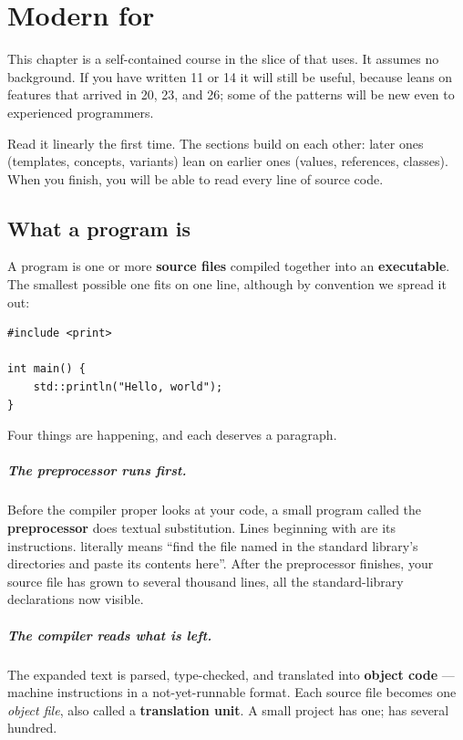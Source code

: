 \chapter{Modern \cpp{} for \maya{}}
\label{ch:cpp}

This chapter is a self-contained course in the slice of \cpp{} that
\maya{} uses. It assumes no \cpp{} background. If you have written
\cpp{}11 or \cpp{}14 it will still be useful, because \maya{} leans
on features that arrived in \cpp{}20, \cpp{}23, and \cpp{}26; some of
the patterns will be new even to experienced \cpp{} programmers.

Read it linearly the first time. The sections build on each other:
later ones (templates, concepts, variants) lean on earlier ones
(values, references, classes). When you finish, you will be able to
read every line of \maya{} source code.

\section{What a \cpp{} program is}
\label{sec:cpp:program}

A \cpp{} program is one or more \textbf{source files} compiled
together into an \textbf{executable}. The smallest possible one fits
on one line, although by convention we spread it out:

\begin{lstlisting}
#include <print>

int main() {
    std::println("Hello, world");
}
\end{lstlisting}

Four things are happening, and each deserves a paragraph.

\paragraph{The preprocessor runs first.}
Before the compiler proper looks at your code, a small program called
the \textbf{preprocessor} does textual substitution. Lines beginning
with \code{\#} are its instructions. 
literally means ``find the file named  in the standard
library's directories and paste its contents here''. After the
preprocessor finishes, your source file has grown to several
thousand lines, all the standard-library declarations now visible.

\paragraph{The compiler reads what is left.}
The expanded text is parsed, type-checked, and translated into
\textbf{object code} --- machine instructions in a not-yet-runnable
format. Each source file becomes one \emph{object file}, also called
a \textbf{translation unit}. A small project has one; \maya{} has
several hundred.

